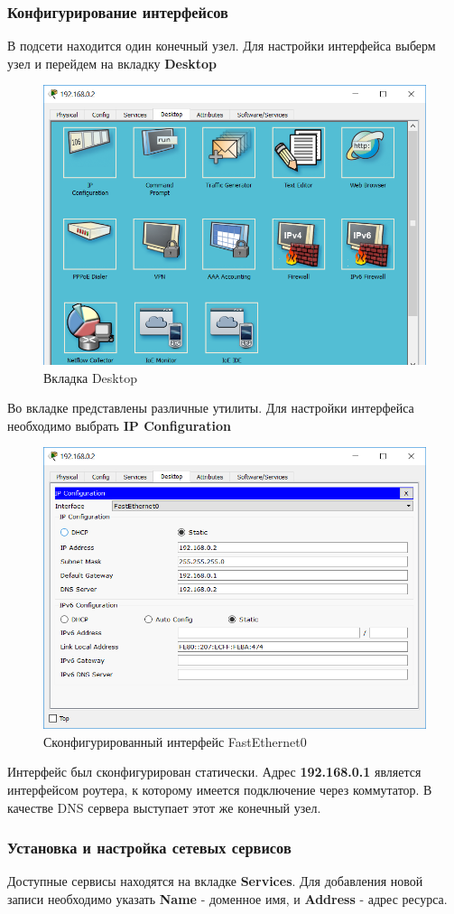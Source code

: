 \documentclass[14pt,a4paper,report]{report}
\begin{document}
\subsubsection{Конфигурирование интерфейсов}
В подсети находится один конечный узел. Для настройки интерфейса выберм узел и перейдем на вкладку \textbf{Desktop}
\begin{figure}[h]
  \centering
  \includegraphics[width=.6\textwidth]{img/net0_0_2__0}
  \caption{Вкладка Desktop}
\end{figure}

Во вкладке представлены различные утилиты. Для настройки интерфейса необходимо выбрать \textbf{IP Configuration}

\begin{figure}[h]
  \centering
  \includegraphics[width=.6\textwidth]{img/net0_0_2__1}
  \caption{Сконфигурированный интерфейс FastEthernet0}
\end{figure}

Интерфейс был сконфигурирован статически. Адрес \textbf{192.168.0.1} является интерфейсом роутера, к которому имеется подключение через коммутатор. В качестве DNS сервера выступает этот же конечный узел.
\subsubsection{Установка и настройка сетевых сервисов}
Доступные сервисы находятся на вкладке \textbf{Services}. Для добавления новой записи необходимо указать \textbf{Name} - доменное имя, и \textbf{Address} - адрес ресурса.
\end{document}
